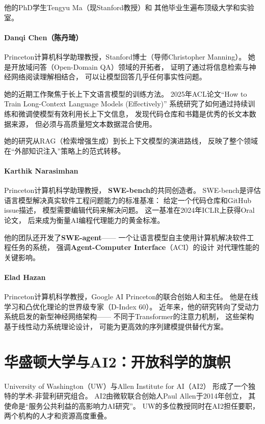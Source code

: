 他的PhD学生Tengyu Ma（现Stanford教授）和
其他毕业生遍布顶级大学和实验室。

\paragraph{Danqi Chen（陈丹琦）}
Princeton计算机科学助理教授，Stanford博士（导师Christopher Manning）。
她是开放域问答（Open-Domain QA）领域的开拓者，
证明了通过将信息检索与神经网络阅读理解相结合，
可以让模型回答几乎任何事实性问题。

她的近期工作聚焦于长上下文语言模型的训练方法。
2025年ACL论文``How to Train Long-Context Language Models (Effectively)''
系统研究了如何通过持续训练和微调使模型有效利用长上下文信息，
发现代码仓库和书籍是优秀的长文本数据来源，
但必须与高质量短文本数据混合使用。

她的研究从RAG（检索增强生成）到长上下文模型的演进路线，
反映了整个领域在``外部知识注入''策略上的范式转移。

\paragraph{Karthik Narasimhan}
Princeton计算机科学助理教授，
\textbf{SWE-bench}的共同创造者。
SWE-bench是评估语言模型解决真实软件工程问题能力的标准基准：
给定一个代码仓库和GitHub issue描述，
模型需要编辑代码来解决问题。
这一基准在2024年ICLR上获得Oral论文，
后来成为衡量AI编程代理能力的黄金标准。

他的团队还开发了\textbf{SWE-agent}——
一个让语言模型自主使用计算机解决软件工程任务的系统，
强调\textbf{Agent-Computer Interface}（ACI）的设计
对代理性能的关键影响。

\paragraph{Elad Hazan}
Princeton计算机科学教授，Google AI Princeton的联合创始人和主任。
他是在线学习和凸优化理论的世界级专家（D-Index 60）。
近年来，他的研究转向了受动力系统启发的新型神经网络架构——
不同于Transformer的注意力机制，
这些架构基于线性动力系统理论设计，
可能为更高效的序列建模提供替代方案。


\section{华盛顿大学与AI2：开放科学的旗帜}
\label{sec:uw-ai2}

University of Washington（UW）与Allen Institute for AI（AI2）
形成了一个独特的学术-非营利研究组合。
AI2由微软联合创始人Paul Allen于2014年创立，
其使命是``服务公共利益的高影响力AI研究''。
UW的多位教授同时在AI2担任要职，
两个机构的人才和资源高度重叠。

